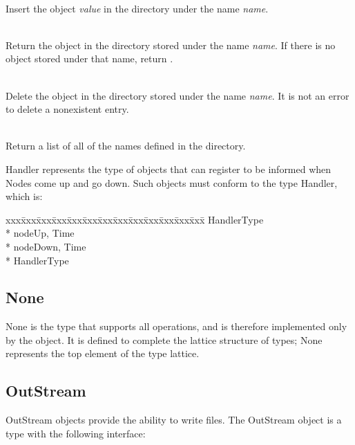 \begin{desc}
  \item[\kw{operation} insert\/\LB{}name \CO{} \tn{String}, value \CO{} \tn{Any}\/\RB{}]~\\
    Insert the object {\it value} in the directory under the name {\it name}.
  \item[\kw{function} lookup\/\LB{}name \CO{} \tn{String}\/\RB{} \returns{} \/\LB{}\tn{Any}\/\RB{}]~\\
    Return the object in the directory stored under the name {\it name}.  If
    there is no object stored under that name, return .
  \item[\kw{operation} delete\/\LB{}\tn{String}\/\RB{}]~\\
    Delete the object in the directory stored under the name {\it name}.
    It is not an error to delete a nonexistent entry.
  \item[\kw{function} list \returns{} \/\LB{}ImmutableVectorOfString\/\RB{}]~\\
    Return a list of all of the names defined in the directory.
\end{desc}

Handler represents the type of objects that can register to be informed when
Nodes come up and go down.  Such objects must conform to the type Handler,
which is:

{\it\begin{minipage}{\textwidth}\begin{tabbing}
xxx\=xxx\=xxx\=xxx\=xxx\=xxx\=xxx\=xxx\=xxx\=xxx\=xxx\=xxx\=xxx\=\+\kill%
 HandlerType\+\\*{}%
   nodeUp\/\LB{}, Time\/\RB{}\\*{}%
   nodeDown\/\LB{}, Time\/\RB{}\-\\*{}%
 HandlerType
\end{tabbing}\end{minipage}}

\subsection{None}
\label{builtin None}
None is the type that supports all operations, and is therefore
implemented only by the  object.  It is defined to complete the
lattice structure of \emd{} types; None represents the top element of the
type lattice.

\subsection{OutStream}
\label{builtin outstream}
OutStream objects provide the ability to write files.  The OutStream object
is a type with the following interface:

